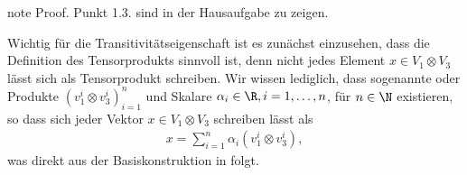 \documentclass[letterpaper,10pt,german]{jupyterBook}
\begin{document}
\begin{sphinxadmonition}{note}
\sphinxAtStartPar
Proof. Punkt 1.\sphinxhyphen{}3. sind in der Hausaufgabe zu zeigen.

\sphinxAtStartPar
{}

\sphinxAtStartPar
Wichtig für die Transitivitätseigenschaft ist es zunächst einzusehen, dass die Definition des Tensorprodukts sinnvoll ist, denn nicht jedes Element \(x\in V_1\otimes V_3\) lässt sich  als Tensorprodukt schreiben.
Wir wissen lediglich, dass  sogenannte  oder  Produkte \((v_1^i\otimes v_3^i)_{i=1}^n\) und Skalare \(\alpha_i\in\R, i=1,\ldots,n\), für \(n\in\N\) existieren, so dass sich jeder Vektor \(x \in V_1 \otimes V_3\) schreiben lässt als
\begin{equation*}
\begin{split}x = \sum_{i=1}^n \alpha_i (v_1^i \otimes v_3^i),\end{split}
\end{equation*}
\sphinxAtStartPar
was direkt aus der Basiskonstruktion in {\hyperref[\detokenize{vektoranalysis/tensor:thm:existenzTensorprodukt}]{}} folgt.


\end{sphinxadmonition}
\end{document}

